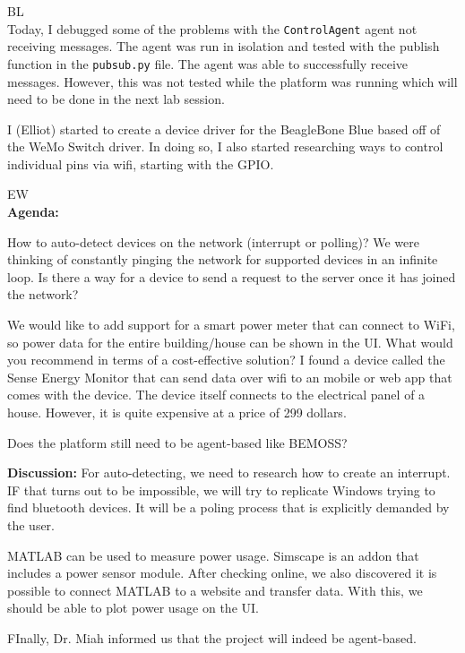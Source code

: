 \documentclass[fontsize=11pt, %
                             paper=letter, %
                             openany, %
                             captions=tableheading,
                             index=totoc,
                             hyperref]{labbook}
\begin{document}
BL\\
Today, I debugged some of the problems with the \texttt{ControlAgent} agent not receiving messages. The agent was run in isolation and tested with the publish function in the \texttt{pubsub.py} file. The agent was able to successfully receive messages. However, this was not tested while the platform was running which will need to be done in the next lab session.

I (Elliot) started to create a device driver for the BeagleBone Blue based off of the WeMo Switch driver. In doing so, I also started researching ways to control individual pins via wifi, starting with the GPIO.


EW\\

\textbf{Agenda:}

How to auto-detect devices on the network (interrupt or polling)? We were thinking of constantly pinging the network for supported devices in an infinite loop. Is there a way for a device to send a request to the server once it has joined the network?

We would like to add support for a smart power meter that can connect to WiFi,
so power data for the entire building/house can be shown in the UI. What would
you recommend in terms of a cost-effective solution? I found a device called the
Sense Energy Monitor that can send data over wifi to an mobile or web app that
comes with the device. The device itself connects to the electrical panel of a
house. However, it is quite expensive at a price of 299 dollars.

Does the platform still need to be agent-based like BEMOSS? 

\textbf{Discussion:} For auto-detecting, we need to research how to create an
interrupt. IF that turns out to be impossible, we will try to replicate Windows
trying to find bluetooth devices. It will be a poling process that is explicitly
demanded by the user.

MATLAB can be used to measure power usage. Simscape is an addon that includes a
power sensor module. After checking online, we also discovered it is possible to
connect MATLAB to a website and transfer data. With this, we should be able to
plot power usage on the UI.

FInally, Dr. Miah informed us that the project will indeed be agent-based.
\end{document}
